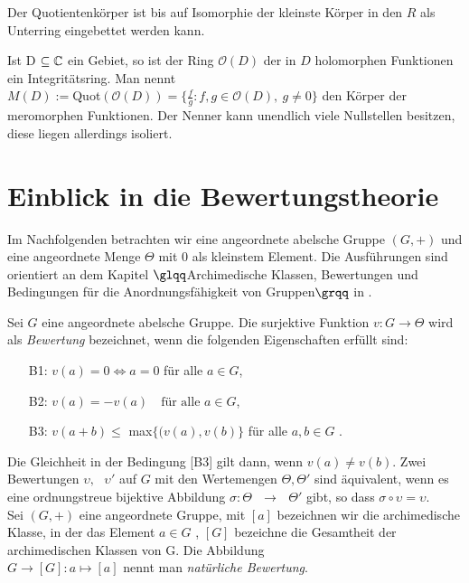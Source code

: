Der Quotientenkörper ist bis auf Isomorphie der kleinste Körper in den $R$ als Unterring eingebettet werden kann.
\begin{bsp}
Ist D $\subseteq \mathbb{C}$ ein Gebiet, so ist der Ring $ \mathcal{O} (D) $ der in $D$ holomorphen Funktionen ein Integritätsring. Man nennt \\
$ M \left(D\right) := $Quot$\left( \mathcal{O} \left( D \right)\right) = \lbrace \frac{f}{g}: f,g \in \mathcal{O} (D), ~g \neq 0\rbrace$ den Körper der meromorphen Funktionen. Der Nenner kann unendlich viele Nullstellen besitzen, diese liegen allerdings isoliert. 
\end{bsp}
%
\section{Einblick in die Bewertungstheorie}
Im Nachfolgenden betrachten wir eine angeordnete abelsche Gruppe $\left(G,+\right)$ und eine angeordnete Menge $\Theta$ mit $0$ als kleinstem Element. Die Ausführungen sind orientiert an dem Kapitel $\glqq$Archimedische Klassen, Bewertungen und Bedingungen für die Anordnungsfähigkeit von Gruppen$\grqq$ in \cite[S. 9 - 11]{priesscrampe83}.
%
%
\begin{defn} %
Sei $G$ eine angeordnete abelsche Gruppe. Die surjektive Funktion $v\colon G \rightarrow \Theta$ wird als \textit{Bewertung} bezeichnet, wenn die folgenden Eigenschaften erfüllt sind:
%
\begin{enumerate}
\item[B1:] $v{(a)} = 0 \Leftrightarrow a = 0$ für alle $a\in G$,
\item[B2:]  $v{(a)} = -v{(a)} \text{  } \text{ für alle } a \in G $,
\item[B3:] $ v{(a+ b)} \le$ max$\{(v{(a)}, v{(b)}\}$ für alle $ a, b \in G$ .
\end{enumerate}
%
\end{defn}
Die Gleichheit in der Bedingung [B3] gilt dann, wenn $v{(a)} \ne v{(b)} $. Zwei Bewertungen $\upsilon, \text{ } \upsilon' $ auf $G$ mit den Wertemengen $\Theta , \Theta' $ sind äquivalent, wenn es eine ordnungstreue bijektive Abbildung $\sigma \colon \Theta \text{ } \rightarrow \text{ } \Theta' $ gibt, so dass $ \sigma \circ \upsilon = \upsilon  $.\\
Sei $\left(G, +\right)$ eine angeordnete Gruppe, mit $[a]$ bezeichnen wir die archimedische Klasse, in der das Element $a\in G$ , $[G]$ bezeichne die Gesamtheit der archimedischen Klassen von G. Die Abbildung 
 \\$G \to [G] \colon a \mapsto [a]$ nennt man \textit{natürliche Bewertung}. %
